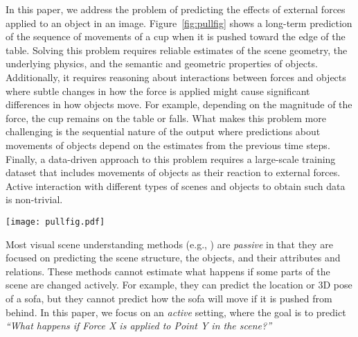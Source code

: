 \documentclass[runningheads]{llncs}
\begin{document}
In this paper, we address the problem of predicting the effects of external forces applied to an object in an image. Figure~\ref{fig:pullfig} shows a long-term prediction of the sequence of movements of a cup when it is pushed toward the edge of the table. Solving this problem requires reliable estimates of the scene geometry, the underlying physics, and the semantic and geometric properties of objects. Additionally, it requires reasoning about interactions between forces and objects where subtle changes in how the force is applied might cause significant differences in how objects move. For example, depending on the magnitude of the force, the cup remains on the table or falls. What makes this problem more challenging is the sequential nature of the output where predictions about movements of objects depend on the estimates from the previous time steps. Finally, a data-driven approach to this problem requires a large-scale training dataset that includes movements of objects as their reaction to external forces. Active interaction with different types of scenes and objects to obtain such data is non-trivial.

\begin{figure*}[t]
\centering
  \texttt{[image: pullfig.pdf]}
\caption{Our goal is to learn ``What happens if Force X is applied to Point Y in the scene?". For example, from a single image, we can infer that the cup will drop if we push it towards the edge of the table. On the right we show the output of our method, i.e. a sequence of velocity vectors in 3D which are caused by applying the force.}
\label{fig:pullfig}
\end{figure*}

Most visual scene understanding methods (e.g., \cite{murphy03,gupta10,yao12}) are \emph{passive} in that they are focused on predicting the scene structure, the objects, and their attributes and relations. These methods cannot estimate what happens if some parts of the scene are changed actively. For example, they can predict the location or 3D pose of a sofa, but they cannot predict how the sofa will move if it is pushed from behind. In this paper, we focus on an \emph{active} setting, where the goal is to predict \textit{``What happens if Force X is applied to Point Y in the scene?''} 
\end{document}
